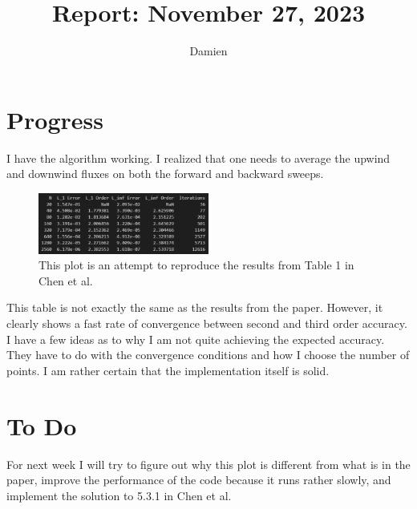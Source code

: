 \documentclass{article}
\title{Report: November 27, 2023}
\author{Damien}
\begin{document}
\maketitle
\section{Progress}
I have the algorithm working. I realized that one needs to average the upwind and downwind fluxes on both the forward and backward sweeps. 
\begin{figure}[h]
    \centering
    \includegraphics[width=0.5\textwidth]{imgs/table.png}
    \caption{This plot is an attempt to reproduce the results from Table 1 in Chen et al.}
    \label{fig:grid}
\end{figure}
This table is not exactly the same as the results from the paper. However, it clearly shows a fast rate of convergence between second and third order accuracy. I have a few ideas as to why I am not quite achieving the expected accuracy. They have to do with the convergence conditions and how I choose the number of points. I am rather certain that the implementation itself is solid.
\section{To Do}
For next week I will try to figure out why this plot is different from what is in the paper, improve the performance of the code because it runs rather slowly, and implement the solution to 5.3.1 in Chen et al.
\end{document}
